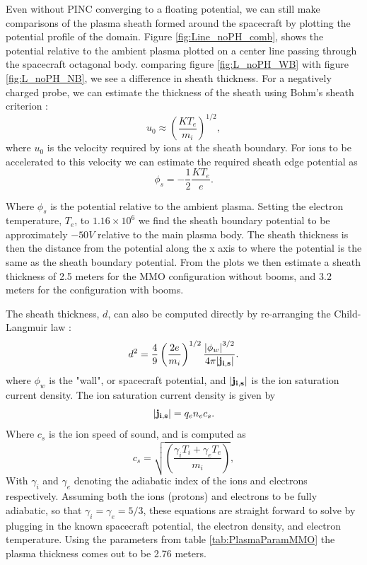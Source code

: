 Even without PINC converging to a floating potential, we can still make comparisons of the plasma sheath formed around the spacecraft by plotting the potential profile of the domain. Figure \ref{fig:Line_noPH_comb}, shows the potential relative to the ambient plasma plotted on a center line passing through the spacecraft octagonal body. comparing figure \ref{fig:L_noPH_WB} with figure \ref{fig:L_noPH_NB}, we see a difference in sheath thickness. For a negatively charged probe, we can estimate the thickness of the sheath using Bohm's sheath criterion \parencite{Chen2018}:
\begin{equation}
    u_0 \approx \left(\frac{K T_e}{m_i}\right)^{1/2},
\end{equation}
where $u_0$ is the velocity required by ions at the sheath boundary. For ions to be accelerated to this velocity we can estimate the required sheath edge potential as
\begin{equation}
    \phi_s = -\frac{1}{2} \frac{K T_e}{e}.
\end{equation}

Where $\phi_s$ is the potential relative to the ambient plasma. Setting the electron temperature, $T_e$, to $1.16 \times 10^6$ we find the sheath boundary potential to be approximately $-50 V$ relative to the main plasma body. The sheath thickness is then the distance from the potential along the x axis to where the potential is the same as the sheath boundary potential. From the plots we then estimate a sheath thickness of 2.5 meters for the MMO configuration without booms, and 3.2 meters for the configuration with booms.

The sheath thickness, $d$, can also be computed directly by re-arranging the Child-Langmuir law \parencite{Chen2018}:
\begin{equation}
    d^2 = \frac{4}{9} \left(\frac{2e}{m_i}\right)^{1/2} \frac{\abs{\phi_w}^{3/2}}{4 \pi \abs{\vb{j_{i,s}}}}.
\end{equation}
where $\phi_w$ is the "wall", or spacecraft potential, and $\abs{\vb{j_{i,s}}}$ is the ion saturation current density. The ion saturation current density is given by
\begin{equation}
    \abs{\vb{j_{i,s}}} = q_e n_e c_s.
\end{equation}
Where $c_s$ is the ion speed of sound, and is computed as
\begin{equation}\label{eq:ionMach}
    c_s = \sqrt{\left(\frac{\gamma_i T_i + \gamma_e T_e}{m_i}\right)},
\end{equation}
With $\gamma_i$ and $\gamma_e$ denoting the adiabatic index of the ions and electrons respectively. Assuming both the ions (protons) and electrons to be fully adiabatic, so that $\gamma_i = \gamma_e = 5/3$, these equations are straight forward to solve by plugging in the known spacecraft potential, the electron density, and electron temperature. Using the parameters from table \ref{tab:PlasmaParamMMO}  the plasma thickness comes out to be 2.76 meters. 

